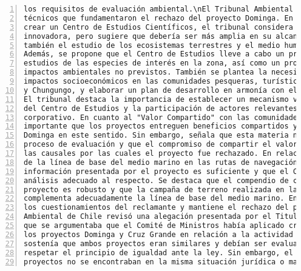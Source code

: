 \begin{Verbatim}[frame=lines, label=Elavoración propia -  Ejemplo de Contexto enviado por el Chatbot a OpenAI
				, fontsize=\scriptsize, numbers=left
				, baselinestretch=0.4
				, formatcom=\color{gray}]
los requisitos de evaluación ambiental.\nEl Tribunal Ambiental ha revisado los argumentos
técnicos que fundamentaron el rechazo del proyecto Dominga. En cuanto a la medida propuesta de
crear un Centro de Estudios Científicos, el tribunal considera que es interesante e
innovadora, pero sugiere que debería ser más amplia en su alcance y concepción, abarcando
también el estudio de los ecosistemas terrestres y el medio humano en la comuna de La Higuera.
Además, se propone que el Centro de Estudios lleve a cabo un programa de investigación y
estudios de las especies de interés en la zona, así como un protocolo de acción frente a
impactos ambientales no previstos. También se plantea la necesidad de medir los posibles
impactos socioeconómicos en las comunidades pesqueras, turísticas y productivas de Los Choros
y Chungungo, y elaborar un plan de desarrollo en armonía con el plan de desarrollo regional.
El tribunal destaca la importancia de establecer un mecanismo vinculante para las decisiones
del Centro de Estudios y la participación de actores relevantes en su diseño y gobierno
corporativo. En cuanto al "Valor Compartido" con las comunidades, el tribunal considera que es
importante que los proyectos entreguen beneficios compartidos y reconoce la propuesta de
Dominga en este sentido. Sin embargo, señala que esta materia no se encuentra discutida en el
proceso de evaluación y que el compromiso de compartir el valor del negocio no puede sobreseer
las causales por las cuales el proyecto fue rechazado. En relación a la supuesta insuficiencia
de la línea de base del medio marino en las rutas de navegación, el tribunal considera que la
información presentada por el proyecto es suficiente y que el Comité de Ministros no hizo un
análisis adecuado al respecto. Se destaca que el compendio de conocimiento entregado por el
proyecto es robusto y que la campaña de terreno realizada en las rutas de navegación
complementa adecuadamente la línea de base del medio marino. En conclusión, el tribunal acoge
los cuestionamientos del reclamante y mantiene el rechazo del proyecto Dominga.\nEl Tribunal
Ambiental de Chile revisó una alegación presentada por el Titular del proyecto Dominga, en la
que se argumentaba que el Comité de Ministros había aplicado criterios diferentes al evaluar
los proyectos Dominga y Cruz Grande en relación a la actividad de navegación. El Titular
sostenía que ambos proyectos eran similares y debían ser evaluados de manera análoga para
respetar el principio de igualdad ante la ley. Sin embargo, el Tribunal determinó que los
proyectos no se encontraban en la misma situación jurídica o material, por lo que era

\end{Verbatim}
